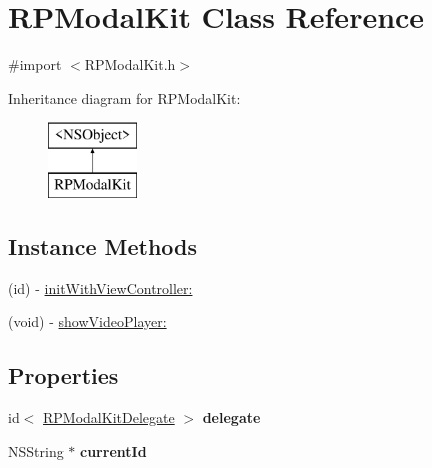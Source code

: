 \hypertarget{interface_r_p_modal_kit}{\section{R\-P\-Modal\-Kit Class Reference}
\label{interface_r_p_modal_kit}
}


{\ttfamily \#import $<$R\-P\-Modal\-Kit.\-h$>$}

Inheritance diagram for R\-P\-Modal\-Kit\-:\begin{figure}[H]
\begin{center}
\leavevmode
\includegraphics[height=2.000000cm]{interface_r_p_modal_kit}
\end{center}
\end{figure}
\subsection*{Instance Methods}
\begin{DoxyCompactItemize}
\item 
(id) -\/ \hyperlink{interface_r_p_modal_kit_accb92d55ac9a495dab8d468f820fc64c}{init\-With\-View\-Controller\-:}
\item 
(void) -\/ \hyperlink{interface_r_p_modal_kit_a89d1f7bf0a9dd1f63d60fbced28e7622}{show\-Video\-Player\-:}
\end{DoxyCompactItemize}
\subsection*{Properties}
\begin{DoxyCompactItemize}
\item 
\hypertarget{interface_r_p_modal_kit_a212ddbcad1a715f3d46aae35a0966a26}{id$<$ \hyperlink{protocol_r_p_modal_kit_delegate-p}{R\-P\-Modal\-Kit\-Delegate} $>$ {\bfseries delegate}}\label{interface_r_p_modal_kit_a212ddbcad1a715f3d46aae35a0966a26}

\item 
\hypertarget{interface_r_p_modal_kit_adc8ab801563dbc84b3ba97e61e60b0b2}{N\-S\-String $\ast$ {\bfseries current\-Id}}\label{interface_r_p_modal_kit_adc8ab801563dbc84b3ba97e61e60b0b2}

\end{DoxyCompactItemize}


